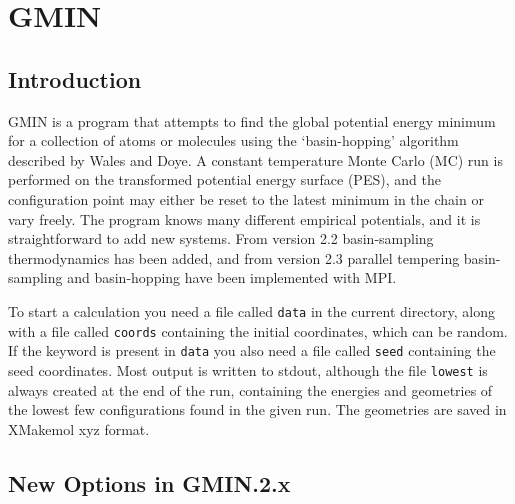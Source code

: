 \chapter{GMIN}
\renewcommand{\pname}{GMIN}
\section{Introduction}

GMIN is a program that attempts to find the global potential energy minimum
for a collection of atoms or molecules using the `basin-hopping' algorithm
described by Wales and Doye.\cite{walesd97a}
A constant temperature Monte Carlo (MC) run is performed on the transformed
potential energy surface (PES), and the configuration point may either be reset 
to the latest minimum in the chain or vary freely.
The program knows many different empirical potentials, and it is straightforward to add new systems.
From version 2.2 basin-sampling thermodynamics has been added, and from 
version 2.3 parallel tempering basin-sampling and basin-hopping have been
implemented with MPI.

To start a calculation you need a file called {\tt data} in the current directory,
along with a file called {\tt coords} containing the initial coordinates,
which can be random. If the {} keyword is present in
{\tt data} you also need a file called {\tt seed} containing the seed coordinates.
Most output is written to stdout, although the file {\tt lowest} is always created
at the end of the run, containing the energies and geometries of the lowest few
configurations found in the given run. The geometries are saved in XMakemol xyz format.

\section{New Options in GMIN.2.x}

